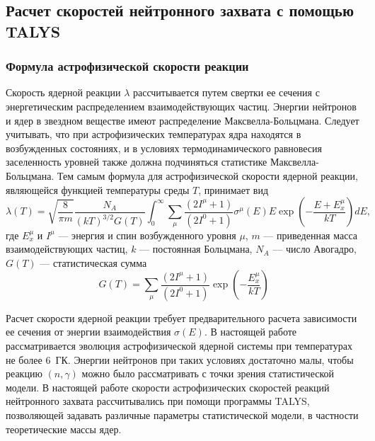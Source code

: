 \subsection{Расчет скоростей нейтронного захвата с помощью TALYS}
\subsubsection{Формула астрофизической скорости реакции}
Скорость ядерной реакции $\lambda$ рассчитывается путем свертки ее сечения с энергетическим распределением взаимодействующих частиц. Энергии нейтронов и ядер в звездном веществе имеют распределение Максвелла-Больцмана. Следует учитывать, что при астрофизических температурах ядра находятся в возбужденных состояниях, и в условиях термодинамического равновесия заселенность уровней также должна подчиняться статистике Максвелла-Больцмана. Тем самым формула для астрофизической скорости ядерной реакции, являющейся функцией температуры среды $T$, принимает вид
\begin{equation}
\displaystyle
\lambda(T) = \sqrt{\frac{8}{\pi m}} \frac{N_A}{(k T)^{3/2} G(T)} \int_0^\infty \sum_\mu \frac{(2 I^\mu + 1)}{(2 I^0 + 1)} \sigma^\mu(E) E \exp \left( - \frac{E + E_x^\mu}{kT} \right) dE,
\end{equation}
где $E^\mu_x$ и $I^\mu$ --- энергия и спин возбужденного уровня $\mu$, $m$ --- приведенная масса взаимодействующих частиц, $k$ --- постоянная Больцмана, $N_A$ --- число Авогадро, $G(T)$ --- статистическая сумма
\begin{equation}
    \displaystyle
    G(T) = \sum_\mu \frac{(2 I^\mu + 1)}{(2 I^0 + 1)} \exp \left( - \frac{E_x^\mu}{kT} \right)
\end{equation}

Расчет скорости ядерной реакции требует предварительного расчета зависимости ее сечения от энергии взаимодействия $\sigma(E)$. В настоящей работе рассматривается эволюция астрофизической ядерной системы при температурах не более $6$~ГК. Энергии нейтронов при таких условиях достаточно малы, чтобы реакцию $(n,\gamma)$ можно было рассматривать с точки зрения статистической модели. В настоящей работе скорости астрофизических скоростей реакций нейтронного захвата рассчитывались при помощи программы TALYS, позволяющей задавать различные параметры статистической модели, в частности теоретические массы ядер. 

